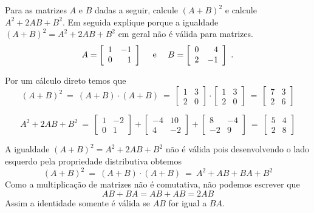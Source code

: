 \begin{problem}
Para as matrizes $A$ e $B$ dadas a seguir, calcule $(A+B)^2$ e calcule $A^2 + 2AB + B^2$. 
Em seguida explique porque a igualdade $(A+B)^2 = A^2 + 2AB + B^2$ em geral não é válida para matrizes.
$$A = \left[\begin{array}{rr}
	1 & -1  \\
	0 &  1  \end{array}\right] \ \ \ \ {\rm e} \ \ \ \
B = \left[\begin{array}{rr}
	0 &  4  \\
	2 & -1  \end{array}\right] \ . $$
\end{problem}
\begin{solution}
Por um cálculo direto temos que 
$$(A+B)^2\ =\ (A+B) \cdot (A+B)\ =\ 
\left[\begin{array}{rr}
	1 &  3  \\
	2 &  0  \end{array}\right] \cdot
\left[\begin{array}{rr}
	1 &  3  \\
	2 &  0  \end{array}\right]\ =\ 
\left[\begin{array}{rr}
	7 &  3  \\
	2 &  6  \end{array}\right]$$

$$A^2 + 2AB + B^2\ =\ 
\left[\begin{array}{rr}
	1 & -2  \\
	0 &  1  \end{array}\right] + 
\left[\begin{array}{rr}
 -4 &  10  \\
	4 &  -2  \end{array}\right] + 
\left[\begin{array}{rr}
	8 &  -4  \\
 -2 &   9  \end{array}\right]\ =\ 
\left[\begin{array}{rr}
	5 &   4  \\
	2 &   8  \end{array}\right]$$

A igualdade $(A+B)^2 = A^2 + 2AB + B^2$ não é válida pois desenvolvendo o lado esquerdo pela propriedade distributiva obtemos
$$(A+B)^2\ =\ (A+B) \cdot (A+B)\ =\ A^2 + AB + BA + B^2$$
Como a multiplicação de matrizes não é comutativa, não podemos escrever que 
$$AB + BA = AB + AB = 2AB$$
Assim a identidade somente é válida se $AB$ for igual a $BA$. 
\end{solution}

